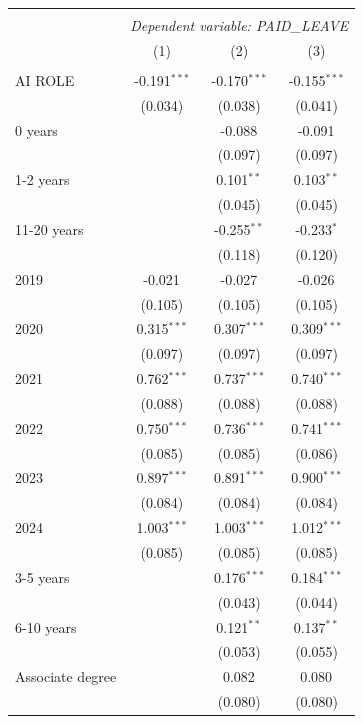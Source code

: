 \begin{table}[!htbp] \centering
\begin{tabular}{@{\extracolsep{5pt}}lccc}
\\[-1.8ex]\hline
\hline \\[-1.8ex]
& \multicolumn{3}{c}{\textit{Dependent variable: PAID_LEAVE}} \
\cr \cline{2-4}
\\[-1.8ex] & (1) & (2) & (3) \\
\hline \\[-1.8ex]
 AI ROLE & -0.191$^{***}$ & -0.170$^{***}$ & -0.155$^{***}$ \\
& (0.034) & (0.038) & (0.041) \\
 0 years & & -0.088$^{}$ & -0.091$^{}$ \\
& & (0.097) & (0.097) \\
 1-2 years & & 0.101$^{**}$ & 0.103$^{**}$ \\
& & (0.045) & (0.045) \\
 11-20 years & & -0.255$^{**}$ & -0.233$^{*}$ \\
& & (0.118) & (0.120) \\
 2019 & -0.021$^{}$ & -0.027$^{}$ & -0.026$^{}$ \\
& (0.105) & (0.105) & (0.105) \\
 2020 & 0.315$^{***}$ & 0.307$^{***}$ & 0.309$^{***}$ \\
& (0.097) & (0.097) & (0.097) \\
 2021 & 0.762$^{***}$ & 0.737$^{***}$ & 0.740$^{***}$ \\
& (0.088) & (0.088) & (0.088) \\
 2022 & 0.750$^{***}$ & 0.736$^{***}$ & 0.741$^{***}$ \\
& (0.085) & (0.085) & (0.086) \\
 2023 & 0.897$^{***}$ & 0.891$^{***}$ & 0.900$^{***}$ \\
& (0.084) & (0.084) & (0.084) \\
 2024 & 1.003$^{***}$ & 1.003$^{***}$ & 1.012$^{***}$ \\
& (0.085) & (0.085) & (0.085) \\
 3-5 years & & 0.176$^{***}$ & 0.184$^{***}$ \\
& & (0.043) & (0.044) \\
 6-10 years & & 0.121$^{**}$ & 0.137$^{**}$ \\
& & (0.053) & (0.055) \\
 Associate degree & & 0.082$^{}$ & 0.080$^{}$ \\
& & (0.080) & (0.080) \\

\end{tabular}
\end{table}
